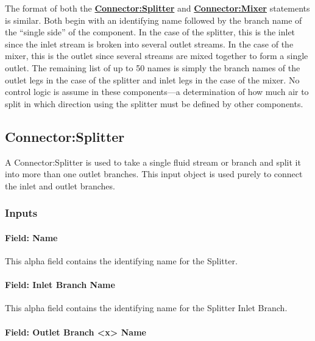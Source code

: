 The format of both the \textbf{\hyperref[connectorsplitter]{Connector:Splitter}} and \textbf{\hyperref[connectormixer]{Connector:Mixer}} statements is similar. Both begin with an identifying name followed by the branch name of the ``single side'' of the component. In the case of the splitter, this is the inlet since the inlet stream is broken into several outlet streams. In the case of the mixer, this is the outlet since several streams are mixed together to form a single outlet. The remaining list of up to 50 names is simply the branch names of the outlet legs in the case of the splitter and inlet legs in the case of the mixer. No control logic is assume in these components---a determination of how much air to split in which direction using the splitter must be defined by other components.

\subsection{Connector:Splitter}\label{connectorsplitter}

A Connector:Splitter is used to take a single fluid stream or branch and split it into more than one outlet branches.  This input object is used purely to connect the inlet and outlet branches.

\subsubsection{Inputs}\label{inputs-034}

\paragraph{Field: Name}\label{field-name-033}

This alpha field contains the identifying name for the Splitter.

\paragraph{Field: Inlet Branch Name}\label{field-inlet-branch-name}

This alpha field contains the identifying name for the Splitter Inlet Branch.

\paragraph{Field: Outlet Branch \textless{}x\textgreater{} Name}\label{field-outlet-branch-x-name}

